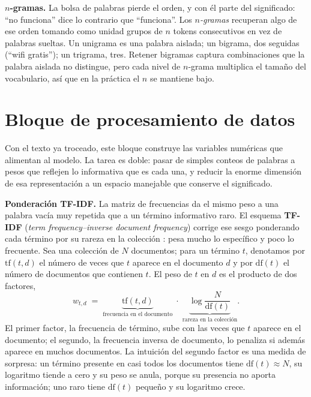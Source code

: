 \documentclass[12pt,a4paper]{report}
\theoremstyle{definition}
\begin{document}
\medskip
\noindent\textbf{$n$-gramas.} La bolsa de palabras pierde el orden, y con él parte del significado:
``no funciona'' dice lo contrario que ``funciona''. Los \emph{$n$-gramas} recuperan algo de ese orden
tomando como unidad grupos de $n$ tokens consecutivos en vez de palabras sueltas. Un unigrama es una
palabra aislada; un bigrama, dos seguidas (``wifi gratis''); un trigrama, tres. Retener bigramas
captura combinaciones que la palabra aislada no distingue, pero cada nivel de $n$-grama multiplica el
tamaño del vocabulario, así que en la práctica el $n$ se mantiene bajo.

\section{Bloque de procesamiento de datos}
\label{sec:procesamiento}

Con el texto ya troceado, este bloque construye las variables numéricas que alimentan al modelo. La
tarea es doble: pasar de simples conteos de palabras a pesos que reflejen lo informativa que es cada
una, y reducir la enorme dimensión de esa representación a un espacio manejable que conserve el
significado.

\medskip
\noindent\textbf{Ponderación TF-IDF.} La matriz de frecuencias da el mismo peso a una palabra vacía muy
repetida que a un término informativo raro. El esquema \textbf{TF-IDF} (\emph{term frequency--inverse
document frequency}) corrige ese sesgo ponderando cada término por su rareza en la colección
\cite{salton1988tfidf}: pesa mucho lo específico y poco lo frecuente. Sea una colección de $N$
documentos; para un término $t$, denotamos por $\mathrm{tf}(t,d)$ el número de veces que $t$ aparece en
el documento $d$ y por $\mathrm{df}(t)$ el número de documentos que contienen $t$. El peso de $t$ en
$d$ es el producto de dos factores,
\begin{equation}
w_{t,d} \;=\; \underbrace{\mathrm{tf}(t,d)}_{\text{frecuencia en el documento}}\;\cdot\;
\underbrace{\log\frac{N}{\mathrm{df}(t)}}_{\text{rareza en la colección}}.
\label{eq:tfidf}
\end{equation}
El primer factor, la frecuencia de término, sube con las veces que $t$ aparece en el documento; el
segundo, la frecuencia inversa de documento, lo penaliza si además aparece en muchos documentos. La
intuición del segundo factor es una medida de sorpresa: un término presente en casi todos los
documentos tiene $\mathrm{df}(t)\approx N$, su logaritmo tiende a cero y su peso se anula, porque su
presencia no aporta información; uno raro tiene $\mathrm{df}(t)$ pequeño y su logaritmo crece.
\end{document}
